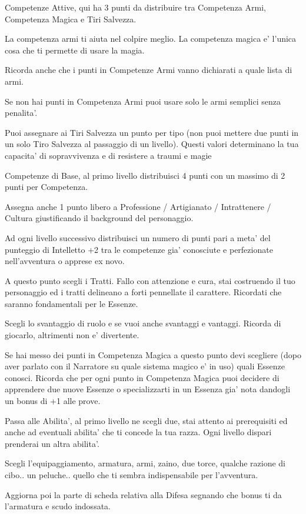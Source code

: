 \documentclass[a4paper,11pt,twoside,openany]{book}
\begin{document}
Competenze Attive, qui ha 3 punti da distribuire tra Competenza Armi, Competenza Magica e Tiri Salvezza.

La competenza armi ti aiuta nel colpire meglio. La competenza magica e' l'unica cosa che ti permette di usare la magia.

Ricorda anche che i punti in Competenze Armi vanno dichiarati a quale lista di armi.

Se non hai punti in Competenza Armi puoi usare solo le armi semplici senza penalita'.

Puoi assegnare ai Tiri Salvezza un punto per tipo (non puoi mettere due punti in un solo Tiro Salvezza al passaggio di un livello). Questi valori determinano la tua capacita' di sopravvivenza e di resistere a traumi e magie

Competenze di Base, al primo livello distribuisci 4 punti con un massimo di 2 punti per Competenza.

Assegna anche 1 punto libero a Professione / Artigianato / Intrattenere / Cultura giustificando il background del personaggio.

Ad ogni livello successivo distribuisci un numero di punti pari a meta' del punteggio di Intelletto +2 tra le competenze gia' conosciute e perfezionate nell'avventura o apprese ex novo.

A questo punto scegli i Tratti. Fallo con attenzione e cura, stai costruendo il tuo personaggio ed i tratti delineano a forti pennellate il carattere. Ricordati che saranno fondamentali per le Essenze.

Scegli lo svantaggio di ruolo e se vuoi anche svantaggi e vantaggi. Ricorda di giocarlo, altrimenti non e' divertente.

Se hai messo dei punti in Competenza Magica a questo punto devi scegliere (dopo aver parlato con il Narratore su quale sistema magico e' in uso) quali Essenze conosci. Ricorda che per ogni punto in Competenza Magica puoi decidere di apprendere due nuove Essenze o specializzarti in un Essenza gia' nota dandogli un bonus di +1 alle prove.

Passa alle Abilita', al primo livello ne scegli due, stai attento ai prerequisiti ed anche ad eventuali abilita' che ti concede la tua razza. Ogni livello dispari prenderai un altra abilita'.

Scegli l'equipaggiamento, armatura, armi, zaino, due torce, qualche razione di cibo.. un peluche.. quello che ti sembra indispensabile per l'avventura.

Aggiorna poi la parte di scheda relativa alla Difesa segnando che bonus ti da l'armatura e scudo indossata.
\end{document}
